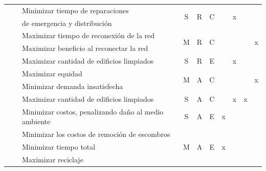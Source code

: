\documentclass[12pt,a4paper]{article}
\begin{document}
\begin{table}[h!]
{\begin{tabular}{l|c|l|c|c|c|c|c|c|c}
\multirow{2}{*}{\citeauthor{Liberatore2014}} & \multirow{2}{*}{\citeyear{Liberatore2014}}                      & Minimizar tiempo de reparaciones & \multirow{2}{*}{S} & \multirow{2}{*}{R} & \multirow{2}{*}{C}  & \multirow{2}{*}{}  & \multirow{2}{*}{x}  & \multirow{2}{*}{ } & \multirow{2}{*}{} \\
& & de emergencia y distribución &  &  &  & & & & \\ \hline    
    
    
\multirow{2}{*}{\citeauthor{Kasaei2016}} & \multirow{2}{*}{\citeyear{Kasaei2016}}                      & Maximizar tiempo de reconexión de la red & \multirow{2}{*}{M} & \multirow{2}{*}{R}  & \multirow{2}{*}{C} & \multirow{2}{*}{}  & \multirow{2}{*}{} & \multirow{2}{*}{} & \multirow{2}{*}{x} \\ \cline{3-3}
& & Maximizar beneficio al reconectar la red & & & & & & & \\ \hline
     
                
\citeauthor{MayaDuque2016} & \citeyear{MayaDuque2016} & Maximizar cantidad de edificios limpiados & S & R & E & & x & & \\ \hline


\multirow{2}{*}{\citeauthor{Ransikarbum2016}} & \multirow{2}{*}{\citeyear{Ransikarbum2016}}                      & Maximizar equidad & \multirow{2}{*}{M} & \multirow{2}{*}{A}  & \multirow{2}{*}{C} & \multirow{2}{*}{}  & \multirow{2}{*}{}  & \multirow{2}{*}{} & \multirow{2}{*}{x} \\ \cline{3-3}
& & Minimizar demanda insatisfecha & & & & & & & \\ \hline


\citeauthor{Akbari2017} & \citeyear{Akbari2017} & Maximizar cantidad de edificios limpiados                               & S & A & C & & x & x & \\ \hline


\citeauthor{Boonmee2018} & \citeyear{Boonmee2018} & Minimizar costos, penalizando daño al medio ambiente & S & A & E & x & & & \\ \hline


\multirow{3}{*}{\citeauthor{Wang2019}} & \multirow{3}{*}{\citeyear{Wang2019}}                      & Minimizar los costos de remoción de escombros & \multirow{3}{*}{M} & \multirow{3}{*}{A} & \multirow{3}{*}{E}  & \multirow{3}{*}{x} & \multirow{3}{*}{}  & \multirow{3}{*}{}  & \multirow{3}{*}{} \\ \cline{3-3}
& & Minimizar tiempo total & & & & & & & \\ \cline{3-3}
& & Maximizar reciclaje & & & & & & & \\ \hline



\end{tabular}}
\end{table}
\end{document}
